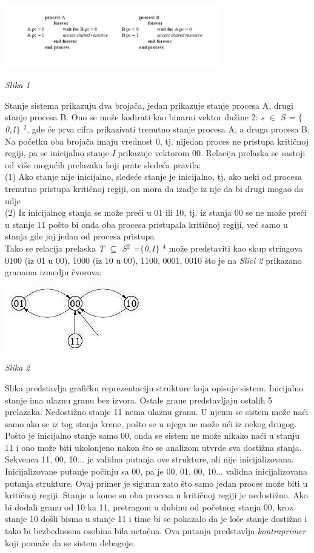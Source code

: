 \documentclass[a4paper]{article}
\begin{document}
\centerline{\includegraphics[width=0.7\textwidth]{slika0}}
\centerline{\textit{Slika 1}}


Stanje sistema prikazuju dva brojača, jedan prikazuje stanje procesa A, drugi stanje procesa B. Ono se može kodirati kao binarni vektor dužine 2:
\textit{s $\in$ S = $\lbrace$0,1$\rbrace$ $^{2}$}, gde će prva cifra prikazivati trenutno stanje procesa A, a druga procesa B. Na početku oba brojača imaju vrednost 0, tj. nijedan proces ne 
pristupa kritičnoj regiji, pa se inicijalno stanje \textit{I} prikazuje vektorom 00. Relacija prelaska se sastoji od više
 mogućih prelazaka koji prate sledeća pravila: \\
(1) Ako stanje nije inicijalno, sledeće stanje je inicijalno, 
	tj. ako neki od procesa trenutno pristupa kritičnoj regiji, on mora da izadje iz nje da bi drugi mogao da udje\\
(2) Iz inicijalnog stanja se može preći u 01 ili 10, 
	tj. iz stanja 00 se ne može preći u stanje 11 pošto bi onda oba procesa pristupala kritičnoj regiji, već samo u stanja gde joj jedan od procesa pristupa \\
Tako se relacija prelaska \textit{ T $\subseteq$ S$^{2}$ =$\lbrace$0,1$\rbrace$ $^{4}$} može predstaviti kao skup stringova 0100 (iz 01 u 00), 1000 (iz 10 u 00), 1100, 0001, 0010 što je na \textit{Slici 2} prikazano granama izmedju čvorova:

\centerline{\includegraphics{slika}}
\centerline{\textit{Slika 2}}

Slika predstavlja grafičku reprezentaciju strukture koja opisuje sistem. Inicijalno stanje ima ulaznu granu bez izvora. Ostale grane predstavljaju ostalih 5 prelazaka. Nedostižno stanje 11 nema ulaznu granu. U njemu se sistem može naći samo ako se iz tog stanja krene, pošto se u njega ne može ući iz nekog drugog. Pošto je inicijalno stanje samo 00, onda se sistem ne može nikako naći u stanju 11 i ono može biti ukolonjeno nakon što se analizom utvrde sva dostižna stanja. Sekvenca 11, 00, 10... je validna putanja ove strukture, ali nije inicijalizovana. Inicijalizovane putanje počinju sa 00, pa je 00, 01, 00, 10... validna inicijalizovana putanja strukture. 
Ovaj primer je siguran zato što samo jedan proces može biti u kritičnoj regiji. Stanje u kome su oba procesa u kritičnoj regiji je nedostižno. Ako bi dodali granu od 10 ka 11, pretragom u dubinu od početnog stanja 00, kroz stanje 10 došli bismo u stanje 11 i time bi se pokazalo da je loše stanje dostižno i tako bi bezbednosna osobina bila netačna. Ova putanja predstavlja \textit{kontraprimer} koji pomaže da se sistem debaguje.\cite{boundedMC}    
\end{document}
